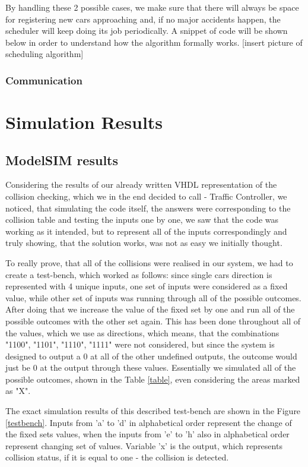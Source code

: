 \documentclass[conference]{IEEEtran}
\begin{document}
By handling these 2 possible cases, we make sure that there will always be space for registering new cars approaching and, if no major accidents happen, the scheduler will keep doing its job periodically.
A snippet of code will be shown below in order to understand how the algorithm formally works.
[insert picture of scheduling algorithm]

\subsubsection{Communication}



\section{Simulation Results}

\subsection{ModelSIM results}

Considering the results of our already written VHDL representation of the collision checking, which we in the end decided to call - Traffic Controller, we noticed, that simulating the code itself, the answers were corresponding to the collision table and testing the inputs one by one, we saw that the code was working as it intended, but to represent all of the inputs correspondingly and truly showing, that the solution works, was not as easy we initially thought.

To really prove, that all of the collisions were realised in our system, we had to create a test-bench, which worked as follows: since single cars direction is represented with 4 unique inputs, one set of inputs were considered as a fixed value, while other set of inputs was running through all of the possible outcomes. After doing that we increase the value of the fixed set by one and run all of the possible outcomes with the other set again. This has been done throughout all of the values, which we use as directions, which means, that the combinations "1100", "1101", "1110", "1111" were not considered, but since the system is designed to output a 0 at all of the other undefined outputs, the outcome would just be 0 at the output through these values. Essentially we simulated all of the possible outcomes, shown in the Table \ref{table}, even considering the areas marked as "X".

The exact simulation results of this described test-bench are shown in the Figure \ref{testbench}. Inputs from 'a' to 'd' in alphabetical order represent the change of the fixed sets values, when the inputs from 'e' to 'h' also in alphabetical order represent changing set of values. Variable 'x' is the output, which represents collision status, if it is equal to one - the collision is detected.
\end{document}
